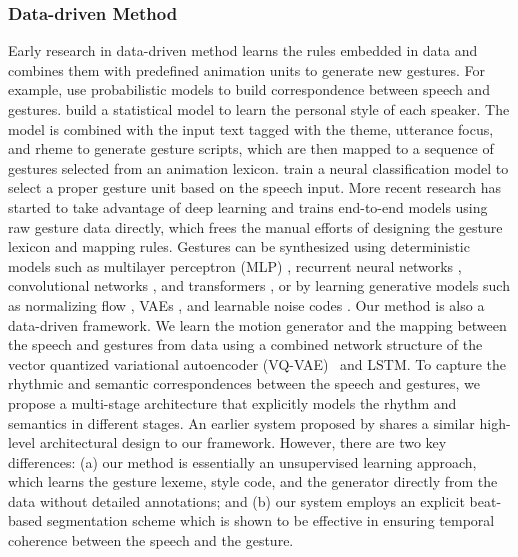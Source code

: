 \documentclass[acmtog,authorversion]{acmart}
\begin{document}
\subsubsection{Data-driven Method}
Early research in data-driven method learns the rules embedded in data and combines them with predefined animation units to generate new gestures. For example, \citet{kopp2006towards, levine2010gesture} use probabilistic models to build correspondence between speech and gestures. \citet{Neff2008Gesture} build a statistical model to learn the personal style of each speaker. The model is combined with the input text tagged with the theme, utterance focus, and rheme to generate gesture scripts, which are then mapped to a sequence of gestures selected from an animation lexicon. \citet{chiu2015predicting} train a neural classification model to select a proper gesture unit based on the speech input. More recent research has started to take advantage of deep learning and trains  end-to-end models using raw gesture data directly, which frees the manual efforts of designing the gesture lexicon and mapping rules. Gestures can be synthesized using deterministic models such as multilayer perceptron (MLP) \cite{kucherenko2020gesticulator}, recurrent neural networks \cite{hasegawa2018evaluation, yoon2019robots, yoon2020speech, bhattacharya2021speech2affectivegestures, liu2022learning}, convolutional networks \cite{habibie2021learning}, and transformers \cite{9417647}, or by learning generative models such as normalizing flow \cite{alexanderson2020style}, VAEs \cite{li2021audio2gestures, xu2022freeform}, and learnable noise codes \cite{qian2021speech}. Our method is also a data-driven framework. We learn the motion generator and the mapping between the speech and gestures from data using a combined network structure of the vector quantized variational autoencoder (VQ-VAE)~\cite{oord2017neural} and LSTM. To capture the rhythmic and semantic correspondences between the speech and gestures, we propose a multi-stage architecture that explicitly models the rhythm and semantics in different stages. An earlier system proposed by \citet{kucherenko2021speech2properties2gestures} shares a similar high-level architectural design to our framework. However, there are two key differences: (a) our method is essentially an unsupervised learning approach, which learns the gesture lexeme, style code, and the generator directly from the data without detailed annotations; and (b) our system employs an explicit beat-based segmentation scheme which is shown to be effective in ensuring temporal coherence between the speech and the gesture.
\end{document}
